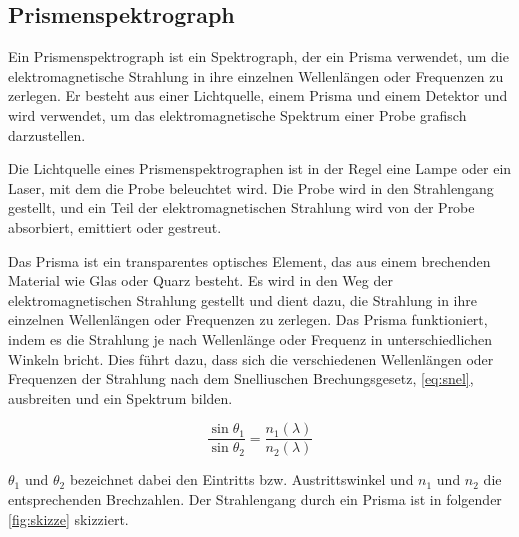 \documentclass[12pt,english,ngerman]{scrartcl}
\begin{document}
\subsection{Prismenspektrograph}
Ein Prismenspektrograph ist ein Spektrograph, der ein Prisma verwendet, um die
elektromagnetische Strahlung in ihre einzelnen Wellenlängen oder Frequenzen zu
zerlegen. Er besteht aus einer Lichtquelle, einem Prisma und einem Detektor und
wird verwendet, um das elektromagnetische Spektrum einer Probe grafisch
darzustellen.

Die Lichtquelle eines Prismenspektrographen ist in der Regel eine Lampe oder
ein Laser, mit dem die Probe beleuchtet wird. Die Probe wird in den
Strahlengang gestellt, und ein Teil der elektromagnetischen Strahlung wird von
der Probe absorbiert, emittiert oder gestreut.

Das Prisma ist ein transparentes optisches Element, das aus einem brechenden
Material wie Glas oder Quarz besteht. Es wird in den Weg der
elektromagnetischen Strahlung gestellt und dient dazu, die Strahlung in ihre
einzelnen Wellenlängen oder Frequenzen zu zerlegen. Das Prisma funktioniert,
indem es die Strahlung je nach Wellenlänge oder Frequenz in unterschiedlichen
Winkeln bricht. Dies führt dazu, dass sich die verschiedenen Wellenlängen oder
Frequenzen der Strahlung nach dem Snelliuschen Brechungsgesetz,
\autoref{eq:snel}, ausbreiten und ein Spektrum bilden. 

\begin{equation}
	\frac{\sin{\theta_1}}{\sin{\theta_2}} = \frac{n_1(\lambda)}{n_2(\lambda)}
	\label{eq:snel}
\end{equation}

$\theta_1$ und $\theta_2$ bezeichnet dabei den Eintritts bzw. Austrittswinkel und $n_1$ und $n_2$ die entsprechenden Brechzahlen.
Der Strahlengang durch ein Prisma ist in folgender \autoref{fig:skizze} skizziert.
\end{document}
